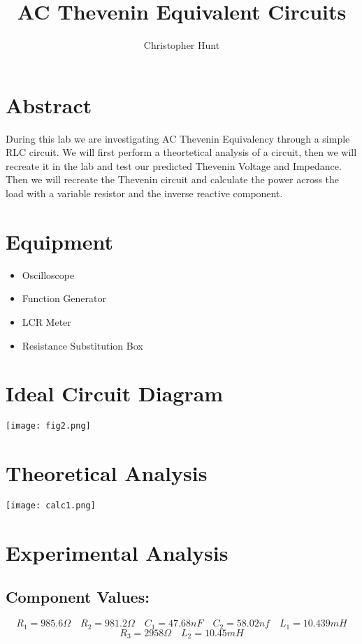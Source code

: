 \documentclass[11pt]{article}
\title{AC Thevenin Equivalent Circuits}
\author{Christopher Hunt}
\date{}
\begin{document}
\pagestyle{fancy}
\fancyhf{}
\rhead{\thepage}
\maketitle

\section*{Abstract}
During this lab we are investigating AC Thevenin Equivalency through a simple RLC circuit. We will first perform a theortetical analysis of a circuit, then we will recreate it in the lab and test our predicted Thevenin Voltage and Impedance. Then we will recreate the Thevenin circuit and calculate the power across the load with a variable resistor and the inverse reactive component.
\section*{Equipment}
\begin{itemize}
  \item Oscilloscope
  \item Function Generator
  \item LCR Meter
  \item Resistance Substitution Box
\end{itemize}
\section*{Ideal Circuit Diagram}
\begin{center}
    \texttt{[image: fig2.png]}
\end{center}
\section*{Theoretical Analysis}
\begin{center}
    \texttt{[image: calc1.png]}
\end{center}

\section*{Experimental Analysis}

\subsection*{Component Values:}
$$R_1 = 985.6 \Omega \quad R_2 = 981.2 \Omega \quad C_1 = 47.68 nF \quad C_2 = 58.02 nf \quad L_1 = 10.439 mH$$
$$R_3 = 2958 \Omega \quad L_2 = 10.45 mH$$
\end{document}
